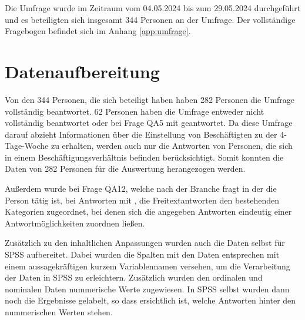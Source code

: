 Die Umfrage wurde im Zeitraum vom 04.05.2024 bis zum 29.05.2024 durchgeführt und es beteiligten sich
insgesamt 344 Personen an der Umfrage. Der vollständige Fragebogen befindet 
sich im Anhang \ref{app:umfrage}.

\section{Datenaufbereitung}
Von den 344 Personen, die sich beteiligt haben haben 282 Personen die Umfrage vollständig beantwortet.
62 Personen haben die Umfrage entweder nicht vollständig beantwortet oder bei Frage QA5  
mit  geantwortet. Da diese Umfrage darauf abzieht Informationen über die 
Einstellung von Beschäftigten zu der 4-Tage-Woche zu erhalten, werden auch nur die 
Antworten von Personen, die sich in einem Beschäftigungsverhältnis befinden berücksichtigt. 
Somit konnten die Daten von 282 Personen für die Auswertung herangezogen werden.

Außerdem wurde bei Frage QA12, welche nach der Branche fragt in der die Person tätig ist,
bei Antworten mit , die Freitextantworten den bestehenden Kategorien zugeordnet,
bei denen sich die angegeben Antworten eindeutig einer Antwortmöglichkeiten zuordnen ließen. 

Zusätzlich zu den inhaltlichen Anpassungen wurden auch die Daten selbst für \ac{SPSS} 
aufbereitet. Dabei wurden die Spalten mit den Daten entsprechen mit einem aussagekräftigen kurzem
Variablennamen versehen, um die Verarbeitung der Daten in \ac{SPSS} zu erleichtern. Zusätzlich wurden 
den ordinalen und nominalen Daten nummerische Werte zugewiesen.
In \ac{SPSS} selbst wurden dann noch die Ergebnisse gelabelt, so dass ersichtlich ist, welche Antworten hinter den 
nummerischen Werten stehen.

